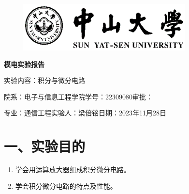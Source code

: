 \documentclass[a4paper,10pt,notitlepage]{article}
\begin{document}
	\large
	\onehalfspacing
	\begin{figure}[h]
		\raggedright
		\includegraphics{预习报告/1.png}
	\end{figure}
	\centering
	{\Huge\textbf{模电实验报告}\par}
	\vspace{0.2cm}
	{\huge{实验内容：积分与微分电路}\par}
	\raggedright
	\vspace{0.3cm}
	\begin{centering}
		{\large 院系：电子与信息工程学院\hfill 学号：22309080\hfill 审批：\hspace{2cm} \par
			专业：通信工程\hfill 实验人：梁倍铭\hfill 日期：2023年11月28日 \par}
	\end{centering}
	\vspace{0.3cm}
	\section*{一、实验目的}
	\begin{enumerate}
		\item 学会用运算放大器组成积分微分电路。
		\item 学会积分微分电路的特点及性能。
	\end{enumerate}
\end{document}
